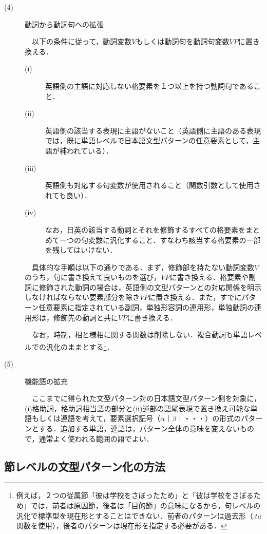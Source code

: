 \documentclass{nlp}
\begin{document}
\begin{description}
\item[(4)]動詞から動詞句への拡張

　以下の条件に従って，動詞変数$V$もしくは動詞句を動詞句変数$VP$に置き換える．
\begin{description}
\item[(i)]英語側の主語に対応しない格要素を１つ以上を持つ動詞句であること．
\item[(ii)]英語側の該当する表現に主語がないこと（英語側に主語のある表現では，既に単語レベルで日本語文型パターンの任意要素として，主語が補われている）．
\item[(iii)]英語側も対応する句変数が使用されること（関数引数として使用されても良い）．
\item[(iv)]なお，日英の該当する動詞とそれを修飾するすべての格要素をまとめて一つの句変数に汎化すること．すなわち該当する格要素の一部を残してはいけない．
\end{description}

　具体的な手順は以下の通りである．まず，修飾部を持たない動詞変数$V$のうち，句に書き換えて良いものを選び，$VP$に書き換える．格要素や副詞に修飾された動詞の場合は，英語側の文型パターンとの対応関係を明示しなければならない要素部分を除き$VP$に置き換える．また，すでにパターン任意要素に指定されている副詞，単独形容詞の連用形，単独動詞の連用形は，修飾先の動詞と共に$VP$に書き換える．

　なお，時制，相と様相に関する関数は削除しない．複合動詞も単語レベルでの汎化のままとする\footnote{例えば，２つの従属節「彼は学校をさぼったため」と「彼は学校をさぼるため」では，前者は原因節，後者は「目的節」の意味になるから，句レベルの汎化で標準型を現在形とすることはできない．前者のパターンは過去形（$.ta$関数を使用），後者のパターンは現在形を指定する必要がある．}．

\item[(5)]機能語の拡充

　ここまでに得られた文型パターン対の日本語文型パターン側を対象に，(i)格助詞，格助詞相当語の部分と(ii)述部の語尾表現で置き換え可能な単語もしくは連語を考えて，要素選択記号（$α$｜$β$｜・・・）の形式のパターンとする．追加する単語，連語は，パターン全体の意味を変えないもので，通常よく使われる範囲の語でよい．

\end{description}

\subsection{節レベルの文型パターン化の方法}
\end{document}
